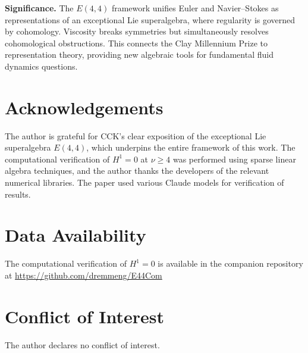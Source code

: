 \documentclass[reqno,10pt]{amsart}
\theoremstyle{plain}
\theoremstyle{definition}
\begin{document}
\textbf{Significance.} The $E(4,4)$ framework unifies Euler and Navier--Stokes as representations of an exceptional Lie superalgebra, where regularity is governed by cohomology. Viscosity breaks symmetries but simultaneously resolves cohomological obstructions. This connects the Clay Millennium Prize to representation theory, providing new algebraic tools for fundamental fluid dynamics questions.


\section*{Acknowledgements}
The author is grateful for CCK's clear exposition of the exceptional Lie superalgebra $E(4,4)$, which underpins the entire framework of this work. The computational verification of $H^1=0$ at $\nu\ge 4$ was performed using sparse linear algebra techniques, and the author thanks the developers of the relevant numerical libraries.
The paper used various Claude models for verification of results.
\section*{Data Availability}
The computational verification of $H^1=0$ is available in the companion repository at \url{https://github.com/dremmeng/E44Com}
\section*{Conflict of Interest}
The author declares no conflict of interest.
\end{document}
